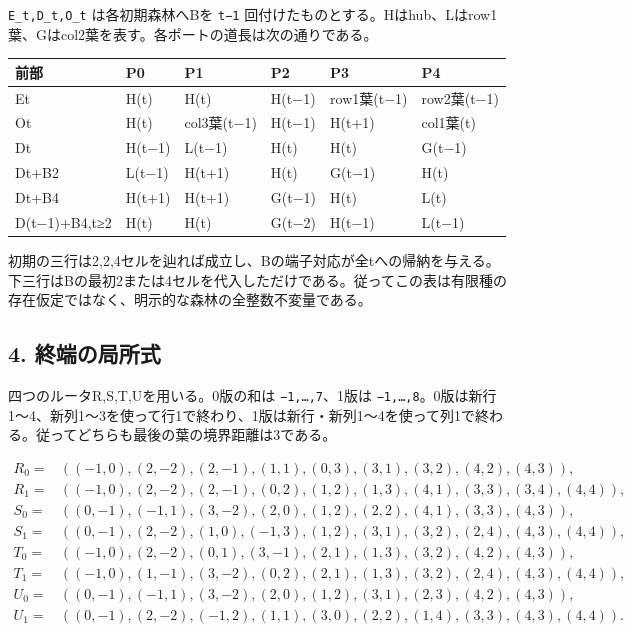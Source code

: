 \documentclass[
  10pt,
  a4paper,
]{article}
\let\originaltexttt\texttt
\renewcommand{\texttt}[1]{\leavevmode\allowbreak\mbox{\originaltexttt{#1}}}
\begin{document}
\Needspace{175pt}
\texttt{E\_t,D\_t,O\_t} は各初期森林へBを \texttt{t−1}
回付けたものとする。Hはhub、Lはrow1葉、Gはcol2葉を表す。各ポートの道長は次の通りである。

\begin{center}
\begin{tabular}{@{}llllll@{}}
\toprule\noalign{}
前部 & P0 & P1 & P2 & P3 & P4 \\
\midrule\noalign{}
Et & H(t) & H(t) & H(t−1) & row1葉(t−1) & row2葉(t−1) \\
Ot & H(t) & col3葉(t−1) & H(t−1) & H(t+1) & col1葉(t) \\
Dt & H(t−1) & L(t−1) & H(t) & H(t) & G(t−1) \\
Dt+B2 & L(t−1) & H(t+1) & H(t) & G(t−1) & H(t) \\
Dt+B4 & H(t+1) & H(t+1) & G(t−1) & H(t) & L(t) \\
D(t−1)+B4,t≥2 & H(t) & H(t) & G(t−2) & H(t−1) & L(t−1) \\
\bottomrule
\end{tabular}
\end{center}

初期の三行は2,2,4セルを辿れば成立し、Bの端子対応が全tへの帰納を与える。下三行はBの最初2または4セルを代入しただけである。従ってこの表は有限種の存在仮定ではなく、明示的な森林の全整数不変量である。

\subsection{4. 終端の局所式}\label{ux7d42ux7aefux306eux5c40ux6240ux5f0f}

四つのルータR,S,T,Uを用いる。0版の和は \texttt{−1,…,7}、1版は
\texttt{−1,…,8}。0版は新行1〜4、新列1〜3を使って行1で終わり、1版は新行・新列1〜4を使って列1で終わる。従ってどちらも最後の葉の境界距離は3である。

\[
\begin{aligned}
R_0={}&((-1,0),(2,-2),(2,-1),(1,1),(0,3),(3,1),(3,2),(4,2),(4,3)),\\
R_1={}&((-1,0),(2,-2),(2,-1),(0,2),(1,2),(1,3),(4,1),(3,3),(3,4),(4,4)),\\
S_0={}&((0,-1),(-1,1),(3,-2),(2,0),(1,2),(2,2),(4,1),(3,3),(4,3)),\\
S_1={}&((0,-1),(2,-2),(1,0),(-1,3),(1,2),(3,1),(3,2),(2,4),(4,3),(4,4)),\\
T_0={}&((-1,0),(2,-2),(0,1),(3,-1),(2,1),(1,3),(3,2),(4,2),(4,3)),\\
T_1={}&((-1,0),(1,-1),(3,-2),(0,2),(2,1),(1,3),(3,2),(2,4),(4,3),(4,4)),\\
U_0={}&((0,-1),(-1,1),(3,-2),(2,0),(1,2),(3,1),(2,3),(4,2),(4,3)),\\
U_1={}&((0,-1),(2,-2),(-1,2),(1,1),(3,0),(2,2),(1,4),(3,3),(4,3),(4,4)).
\end{aligned}
\]
\end{document}
